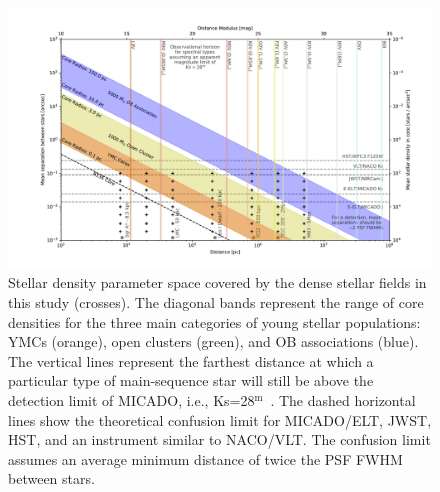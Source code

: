 \documentclass[referee]{aa}
\newcommand{\m}{$^\mathrm{m}$~}
\begin{document}
\begin{figure}

    \centering
    \includegraphics[width=\textwidth]{resolved_stellar_densities.pdf}

    \caption{Stellar density parameter space covered by the dense stellar fields in this study (crosses).
    The diagonal bands represent the range of core densities for the three main categories of young stellar populations: YMCs (orange), open clusters (green), and OB associations (blue).
    The vertical lines represent the farthest distance at which a particular type of main-sequence star will still be above the detection limit of MICADO, i.e., Ks=28\m.
    The dashed horizontal lines show the theoretical confusion limit for MICADO/ELT, JWST, HST, and an instrument similar to NACO/VLT.
    The confusion limit assumes an average minimum distance of twice the PSF FWHM between stars.
    }

    \label{fig:resolved_stellar_densities}

\end{figure}
\end{document}
